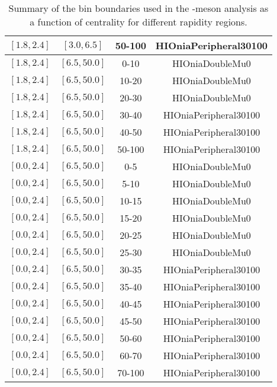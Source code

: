 \begin{table}[htb!]
\begin{tabular}{|c|c|c|c|}
  $[1.8,2.4]$ & $[3.0,6.5]$ & 50-100 & HIOniaPeripheral30100 \\
      \hline
  $[1.8,2.4]$ & $[6.5,50.0]$ & 0-10 & HIOniaDoubleMu0 \\
  $[1.8,2.4]$ & $[6.5,50.0]$ & 10-20 & HIOniaDoubleMu0 \\
  $[1.8,2.4]$ & $[6.5,50.0]$ & 20-30 & HIOniaDoubleMu0 \\
  $[1.8,2.4]$ & $[6.5,50.0]$ & 30-40 & HIOniaPeripheral30100 \\
  $[1.8,2.4]$ & $[6.5,50.0]$ & 40-50 & HIOniaPeripheral30100 \\
  $[1.8,2.4]$ & $[6.5,50.0]$ & 50-100 & HIOniaPeripheral30100 \\
        \hline
  $[0.0,2.4]$ & $[6.5,50.0]$ & 0-5 & HIOniaDoubleMu0 \\
  $[0.0,2.4]$ & $[6.5,50.0]$ & 5-10 & HIOniaDoubleMu0 \\
  $[0.0,2.4]$ & $[6.5,50.0]$ & 10-15 & HIOniaDoubleMu0 \\
  $[0.0,2.4]$ & $[6.5,50.0]$ & 15-20 & HIOniaDoubleMu0 \\
  $[0.0,2.4]$ & $[6.5,50.0]$ & 20-25 & HIOniaDoubleMu0 \\
  $[0.0,2.4]$ & $[6.5,50.0]$ & 25-30 & HIOniaDoubleMu0 \\
  $[0.0,2.4]$ & $[6.5,50.0]$ & 30-35 & HIOniaPeripheral30100 \\
  $[0.0,2.4]$ & $[6.5,50.0]$ & 35-40 & HIOniaPeripheral30100 \\
  $[0.0,2.4]$ & $[6.5,50.0]$ & 40-45 & HIOniaPeripheral30100 \\
  $[0.0,2.4]$ & $[6.5,50.0]$ & 45-50 & HIOniaPeripheral30100 \\
  $[0.0,2.4]$ & $[6.5,50.0]$ & 50-60 & HIOniaPeripheral30100 \\
  $[0.0,2.4]$ & $[6.5,50.0]$ & 60-70 & HIOniaPeripheral30100 \\
  $[0.0,2.4]$ & $[6.5,50.0]$ & 70-100 & HIOniaPeripheral30100 \\
  \hline
 \end{tabular}
 \caption{Summary of the bin boundaries used in the \JPsi-meson \raa analysis as a function of centrality for different rapidity regions.}
 \label{tab:anabinsCent}
\end{table}
  
